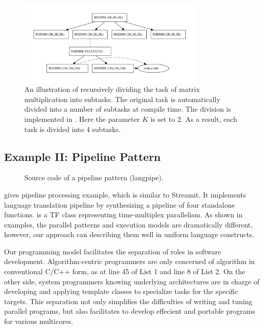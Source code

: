 \begin{figure}[htb]
\includegraphics[width=3.5in]{../mmexample}
\caption{An illustration of recursively dividing the task of matrix multiplication
into subtasks. The original task
is automatically divided into a number of subtasks at compile time.
The division is implemented in . Here the parameter $K$ is set to 2.
As a result, each task is divided into 4 subtasks.
}
\label{fig:mmexample}
\end{figure}


\subsection{Example II: Pipeline Pattern}

\begin{figure}[hbt]
  \caption{Source code of a pipeline pattern (langpipe).}
  \label{fig:pipe}
\end{figure}

 gives pipeline processing example, which is similar to Streamit.
It implements language translation pipeline by
synthesizing a pipeline of four standalone functions.  is a TF class
representing time-multiplex parallelism. As shown in examples,
the parallel patterns and execution models are dramatically
different, however, our approach can describing them well in uniform
language constructs.

Our programming model facilitates the separation of roles in software
development. Algorithm-centric programmers are only concerned of algorithm
in conventional C/C++ form, as at line 45 of List 1 and line 8 of
List 2. On the other side,  system programmers knowing underlying
architectures are in charge of developing and
applying template classes to specialize tasks for the specific
targets. This separation not only simplifies the difficulties of writing and
tuning parallel programs, but also facilitates to develop effecient and
portable programs for various multicores.

